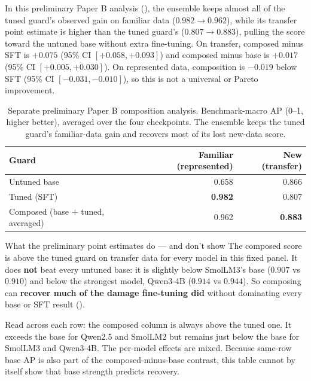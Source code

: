 \documentclass[11pt]{article}
\begin{document}
In this preliminary Paper B analysis (), the ensemble keeps almost all of
the tuned guard's observed gain on familiar data ($0.982 \to 0.962$), while its transfer point
estimate is higher than the tuned guard's ($0.807 \to 0.883$), pulling the score toward the
untuned base without extra fine-tuning. On transfer, composed minus SFT is $+0.075$ (95\% CI
$[+0.058,+0.093]$) and composed minus base is $+0.017$ (95\% CI $[+0.005,+0.030]$).
On represented data, composition is $-0.019$ below SFT (95\% CI $[-0.031,-0.010]$), so this
is not a universal or Pareto improvement.

\begin{table}[t]
\centering\small
\caption{Separate preliminary Paper B composition analysis. Benchmark-macro AP (0--1, higher better),
averaged over the four checkpoints. The ensemble keeps the tuned guard's familiar-data gain and
recovers most of its lost new-data score.}
\label{tab:compose}
\begin{tabular}{lrr}
\toprule
Guard & Familiar (represented) & New (transfer) \\
\midrule
Untuned base & 0.658 & 0.866 \\
Tuned (SFT) & \textbf{0.982} & 0.807 \\
Composed (base $+$ tuned, averaged) & 0.962 & \textbf{0.883} \\
\bottomrule
\end{tabular}
\end{table}

\begin{takeaway}{What the preliminary point estimates do --- and don't show}
\small
The composed score is above the tuned guard on transfer data for every model in this fixed panel.
It does \textbf{not} beat every untuned base: it is slightly below SmolLM3's base
($0.907$ vs $0.910$) and below the strongest model, Qwen3-4B ($0.914$ vs $0.944$).
So composing can \textbf{recover much of the damage fine-tuning did} without dominating every
base or SFT result ().
\end{takeaway}

Read  across each row: the composed column is always above the tuned one.
It exceeds the base for Qwen2.5 and SmolLM2 but remains just below the base for SmolLM3 and
Qwen3-4B. The per-model effects are mixed. Because same-row base AP is also part of the
composed-minus-base contrast, this table cannot by itself show that base strength predicts recovery.
\end{document}
